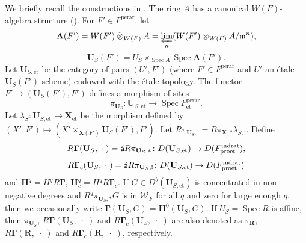 \documentclass{amsart}
\theoremstyle{remark}
\numberwithin{equation}{section}
\newcommand{\tensor}{\mathbin{\otimes}}
\newcommand{\et}{\mathrm{et}}
\newcommand{\invlim}{\varprojlim}
\newcommand{\rat}{\mathrm{rat}}
\newcommand{\ind}{\mathrm{ind}}
\newcommand{\pro}{\mathrm{pro}}
\newcommand{\perar}{\mathrm{perar}}
\newcommand{\alg}[1]{\mathbf{#1}}
\newcommand{\var}{\;\cdot\;}
\newcommand{\ideal}[1]{\mathfrak{#1}}
\newcommand{\ctensor}{\mathbin{\Hat{\otimes}}}
\newcommand{\algebrize}{\Acute{\mathsf{a}}}
\DeclareMathOperator{\Spec}{Spec}
\begin{document}
We briefly recall the constructions in \cite[Section 10.1]{Suz24}.
The ring $A$ has a canonical $W(F)$-algebra structure
(\cite[Chapter V, Section 4, Theorem 2.1]{DG70b}).
For $F' \in F^{\perar}$, let
	\[
			\alg{A}(F')
		=
			W(F') \ctensor_{W(F)} A
		=
			\invlim_{n} (W(F') \tensor_{W(F)} A / \ideal{m}^{n}),
	\]
	\[
			\alg{U}_{S}(F')
		=
			U_{S} \times_{\Spec A} \Spec \alg{A}(F').
	\]
Let $\alg{U}_{S, \et}$ be the category of pairs $(U', F')$
(where $F' \in F^{\perar}$ and $U'$ an \'etale $\alg{U}_{S}(F')$-scheme)
endowed with the \'etale topology.
The functor $F' \mapsto (\alg{U}_{S}(F'), F')$ defines a morphism of sites
	\[
			\pi_{\alg{U}_{S}}
		\colon
			\alg{U}_{S, \et}
		\to
			\Spec F^{\perar}_{\et}.
	\]
Let $\lambda_{S} \colon \alg{U}_{S, \et} \to \alg{X}_{\et}$ be the morphism defined by
$(X', F') \mapsto (X' \times_{\alg{X}(F')} \alg{U}_{S}(F'), F')$.
Let $R \pi_{\alg{U}_{S}, !} = R \pi_{\alg{X}, \ast} \lambda_{S, !}$.
Define
	\[
			R \alg{\Gamma}(\alg{U}_{S}, \var)
		=
			\algebrize R \pi_{\alg{U}_{S}, \ast}
		\colon
			D(\alg{U}_{S, \et})
		\to
			D(F^{\ind\rat}_{\pro\et}),
	\]
	\[
			R \alg{\Gamma}_{c}(\alg{U}_{S}, \var)
		=
			\algebrize R \pi_{\alg{U}_{S}, !}
		\colon
			D(\alg{U}_{S, \et})
		\to
			D(F^{\ind\rat}_{\pro\et})
	\]
and $\alg{H}^{q} = H^{q} R \alg{\Gamma}$, $\alg{H}^{q}_{c} = H^{q} R \alg{\Gamma}_{c}$.
If $G \in D^{b}(\alg{U}_{S, \et})$ is concentrated in non-negative degrees
and $R^{q} \pi_{\alg{U}_{S}, \ast} G$ is in $\mathcal{W}_{F}$ for all $q$ and zero for large enough $q$,
then we occasionally write $\alg{\Gamma}(\alg{U}_{S}, G) = \alg{H}^{0}(\alg{U}_{S}, G)$.
If $U_{S} = \Spec R$ is affine,
then $\pi_{\alg{U}_{S}}$, $R \alg{\Gamma}(\alg{U}_{S}, \var)$ and $R \alg{\Gamma}_{c}(\alg{U}_{S}, \var)$
are also denoted as $\pi_{\alg{R}}$, $R \alg{\Gamma}(\alg{R}, \var)$ and $R \alg{\Gamma}_{c}(\alg{R}, \var)$, respectively.
\end{document}
